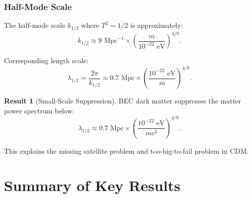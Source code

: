 \documentclass[11pt,a4paper]{article}
\theoremstyle{definition}
\newtheorem{result}{Result}
\theoremstyle{remark}
\begin{document}
\subsubsection{Half-Mode Scale}

The half-mode scale $k_{1/2}$ where $T^2 = 1/2$ is approximately:
\begin{equation}
k_{1/2} \approx 9 \text{ Mpc}^{-1} \times \left(\frac{m}{10^{-22}\text{ eV}}\right)^{4/9}.
\end{equation}

Corresponding length scale:
\begin{equation}
\lambda_{1/2} = \frac{2\pi}{k_{1/2}} \approx 0.7 \text{ Mpc} \times \left(\frac{10^{-22}\text{ eV}}{m}\right)^{4/9}.
\end{equation}

\begin{result}[Small-Scale Suppression]
BEC dark matter suppresses the matter power spectrum below:
\begin{equation}
\boxed{\lambda_{1/2} \approx 0.7 \text{ Mpc} \times \left(\frac{10^{-22}\text{ eV}}{mc^2}\right)^{4/9}.}
\end{equation}

This explains the missing satellite problem and too-big-to-fail problem in CDM.
\end{result}

\section{Summary of Key Results}
\label{sec:summary}
\end{document}
